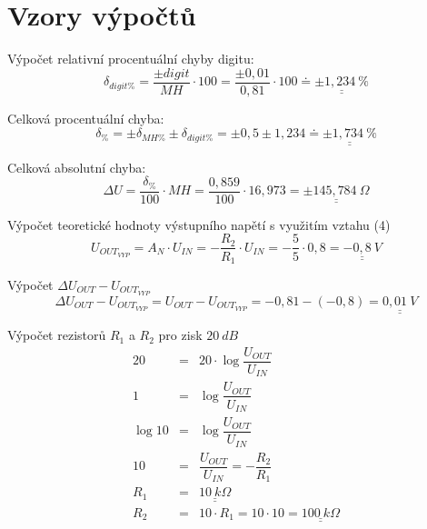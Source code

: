 \section{Vzory výpočtů}
  
  Výpočet relativní procentuální chyby digitu:
  \begin{equation}
    \delta _{digit\%} = \dfrac{\pm digit}{MH} \cdot 100 = \dfrac{\pm 0,01}{0,81} \cdot 100 \doteq \underline{\underline{\pm 1,234~\%}}
    \nonumber
  \end{equation}
  
  Celková procentuální chyba:
  \begin{equation}
    \delta_{\%} = \pm\delta_{MH\%} \pm \delta_{digit\%} = \pm 0,5 \pm 1,234 \doteq \underline{\underline{\pm 1,734~\%}}
    \nonumber
  \end{equation}
  
  Celková absolutní chyba:
  \begin{equation}
    \Delta U = \dfrac{\delta_\%}{100} \cdot MH = \dfrac{0,859}{100} \cdot 16,973 = \underline{\underline{\pm 145,784~\Omega}}
    \nonumber
  \end{equation}
  
  Výpočet teoretické hodnoty výstupního napětí s využitím vztahu (4)
  \begin{equation}
    U_{OUT_{VYP}} = A_N \cdot U_{IN} = -\dfrac{R_2}{R_1} \cdot U_{IN} =  -\dfrac{5}{5} \cdot 0,8 = \underline{\underline{-0,8~V}}
    \nonumber
  \end{equation}
  
  Výpočet $\Delta U_{OUT} - U_{OUT_{VYP}}$
  \begin{equation}
    \Delta U_{OUT} - U_{OUT_{VYP}} = U_{OUT} - U_{OUT_{VYP}} = -0,81 - (-0,8) = \underline{\underline{0,01~V}}
    \nonumber
  \end{equation}
  
  Výpočet rezistorů $R_1$ a $R_2$ pro zisk $20~dB$
  \begin{eqnarray}
    20 &=& 20 \cdot \log\dfrac{U_{OUT}}{U_{IN}} \\\nonumber
    1 &=& \log\dfrac{U_{OUT}}{U_{IN}} \\\nonumber
    \log10 &=& \log\dfrac{U_{OUT}}{U_{IN}} \\\nonumber
    10 &=& \dfrac{U_{OUT}}{U_{IN}} = -\dfrac{R_2}{R_1} \\\nonumber
    R_1 &=& \underline{\underline{10~k\Omega}} \\\nonumber
    R_2 &=& 10 \cdot R_1 = 10 \cdot 10 = \underline{\underline{100~k\Omega}}
    \nonumber
  \end{eqnarray}
